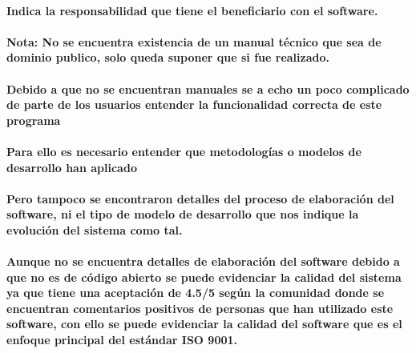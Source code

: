 \documentclass[12pt,a4paper]{ articule }
\begin{document}
\paragraph{Indica la responsabilidad que tiene el beneficiario con el software.}

\paragraph{Nota: No se encuentra existencia de un manual técnico que sea de dominio publico, solo queda suponer que si fue realizado.}
\paragraph{Debido a que no se encuentran manuales se a echo un poco complicado de parte de los usuarios entender la funcionalidad correcta de este programa }

\paragraph{Para ello es necesario entender que metodologías o modelos de desarrollo han aplicado }
\paragraph{Pero tampoco se encontraron detalles del proceso de elaboración del software, ni el tipo de modelo de desarrollo que nos indique la evolución del sistema como tal.}
\paragraph{Aunque no se encuentra detalles de elaboración del software debido a que no es de código abierto se puede evidenciar la calidad del sistema ya que tiene una aceptación de 4.5/5 según la comunidad donde se encuentran comentarios positivos de personas que han utilizado este software, con ello se puede evidenciar la calidad del software que es el enfoque principal del estándar ISO 9001.}
\end{document}

